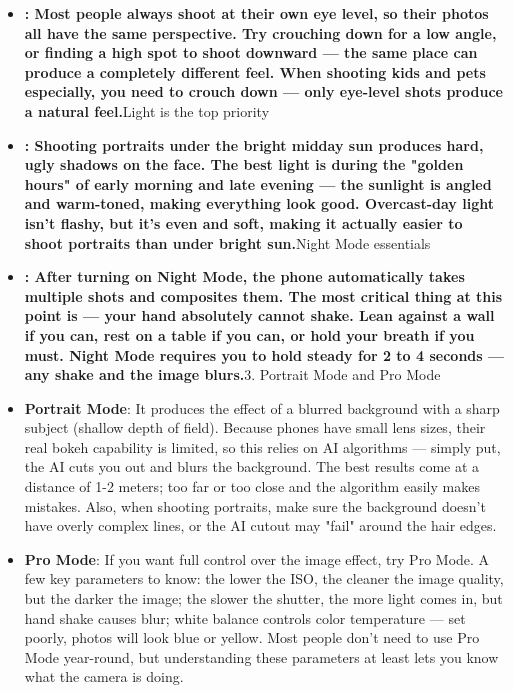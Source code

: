 \begin{itemize}
  \item \textbf{: Most people always shoot at their own eye level, so their photos all have the same perspective. Try crouching down for a low angle, or finding a high spot to shoot downward — the same place can produce a completely different feel. When shooting kids and pets especially, you need to crouch down — only eye-level shots produce a natural feel.}Light is the top priority
  \item \textbf{: Shooting portraits under the bright midday sun produces hard, ugly shadows on the face. The best light is during the "golden hours" of early morning and late evening — the sunlight is angled and warm-toned, making everything look good. Overcast-day light isn't flashy, but it's even and soft, making it actually easier to shoot portraits than under bright sun.}Night Mode essentials
  \item \textbf{: After turning on Night Mode, the phone automatically takes multiple shots and composites them. The most critical thing at this point is — your hand absolutely cannot shake. Lean against a wall if you can, rest on a table if you can, or hold your breath if you must. Night Mode requires you to hold steady for 2 to 4 seconds — any shake and the image blurs.}3. Portrait Mode and Pro Mode
  \item \textbf{Portrait Mode}: It produces the effect of a blurred background with a sharp subject (shallow depth of field). Because phones have small lens sizes, their real bokeh capability is limited, so this relies on AI algorithms — simply put, the AI cuts you out and blurs the background. The best results come at a distance of 1-2 meters; too far or too close and the algorithm easily makes mistakes. Also, when shooting portraits, make sure the background doesn't have overly complex lines, or the AI cutout may "fail" around the hair edges.
  \item \textbf{Pro Mode}: If you want full control over the image effect, try Pro Mode. A few key parameters to know: the lower the ISO, the cleaner the image quality, but the darker the image; the slower the shutter, the more light comes in, but hand shake causes blur; white balance controls color temperature — set poorly, photos will look blue or yellow. Most people don't need to use Pro Mode year-round, but understanding these parameters at least lets you know what the camera is doing.
\end{itemize}


